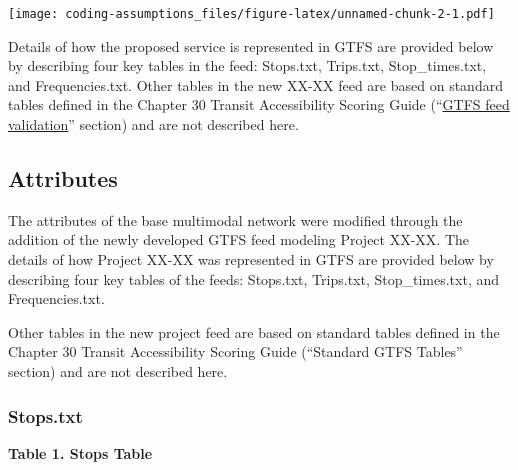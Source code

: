 \documentclass[
]{article}
\begin{document}
\texttt{[image: coding-assumptions\_files/figure-latex/unnamed-chunk-2-1.pdf]}

Details of how the proposed service is represented in GTFS are provided
below by describing four key tables in the feed: Stops.txt, Trips.txt,
Stop\_times.txt, and Frequencies.txt. Other tables in the new XX-XX feed
are based on standard tables defined in the Chapter 30 Transit
Accessibility Scoring Guide
(``\href{https://accessdocs.readthedocs.io/en/latest/quality-assurance.html\#gtfs-feed-validation}{GTFS
feed validation}'' section) and are not described here.

\subsection{Attributes}\label{attributes}

The attributes of the base multimodal network were modified through the
addition of the newly developed GTFS feed modeling Project XX-XX. The
details of how Project XX-XX was represented in GTFS are provided below
by describing four key tables of the feeds: Stops.txt, Trips.txt,
Stop\_times.txt, and Frequencies.txt.

Other tables in the new project feed are based on standard tables
defined in the Chapter 30 Transit Accessibility Scoring Guide
(``Standard GTFS Tables'' section) and are not described here.

\subsubsection{Stops.txt}\label{stops.txt}

\textbf{Table 1. Stops Table}
\end{document}
